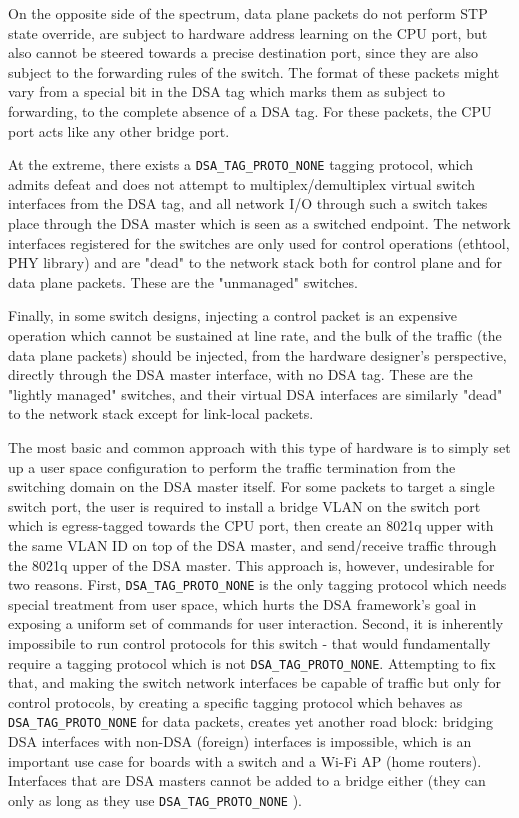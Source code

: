\documentclass[letterpaper]{article}
\begin{document}
On the opposite side of the spectrum, data plane packets do not perform STP
state override, are subject to hardware address learning on the CPU port, but
also cannot be steered towards a precise destination port, since they are also
subject to the forwarding rules of the switch. The format of these packets
might vary from a special bit in the DSA tag which marks them as subject to
forwarding, to the complete absence of a DSA tag. For these packets, the CPU
port acts like any other bridge port.

At the extreme, there exists a \verb|DSA_TAG_PROTO_NONE| tagging protocol,
which admits defeat and does not attempt to multiplex/demultiplex virtual
switch interfaces from the DSA tag, and all network I/O through such a switch
takes place through the DSA master which is seen as a switched endpoint. The
network interfaces registered for the switches are only used for control
operations (ethtool, PHY library) and are "dead" to the network stack both for
control plane and for data plane packets. These are the "unmanaged" switches.

Finally, in some switch designs, injecting a control packet is an expensive
operation which cannot be sustained at line rate, and the bulk of the traffic
(the data plane packets) should be injected, from the hardware designer's
perspective, directly through the DSA master interface, with no DSA tag.
These are the "lightly managed" switches, and their virtual DSA interfaces are
similarly "dead" to the network stack except for link-local packets.

The most basic and common approach with this type of hardware is to simply set
up a user space configuration to perform the traffic termination from the
switching domain on the DSA master itself. For some packets to target a single
switch port, the user is required to install a bridge VLAN on the switch port
which is egress-tagged towards the CPU port, then create an 8021q upper with
the same VLAN ID on top of the DSA master, and send/receive traffic through the
8021q upper of the DSA master. This approach is, however, undesirable for two
reasons. First, \verb|DSA_TAG_PROTO_NONE| is the only tagging protocol which
needs special treatment from user space, which hurts the DSA framework's goal
in exposing a uniform set of commands for user interaction. Second, it is
inherently impossibile to run control protocols for this switch - that would
fundamentally require a tagging protocol which is not \verb|DSA_TAG_PROTO_NONE|.
Attempting to fix that, and making the switch network interfaces be capable of
traffic but only for control protocols, by creating a specific tagging protocol
which behaves as \verb|DSA_TAG_PROTO_NONE| for data packets, creates yet
another road block: bridging DSA interfaces with non-DSA (foreign) interfaces
is impossible, which is an important use case for boards with a switch and a
Wi-Fi AP (home routers). Interfaces that are DSA masters cannot be added to a
bridge either (they can only as long as they use \verb|DSA_TAG_PROTO_NONE|
\cite{reject-dsa-masters-as-bridge-ports}).
\end{document}
